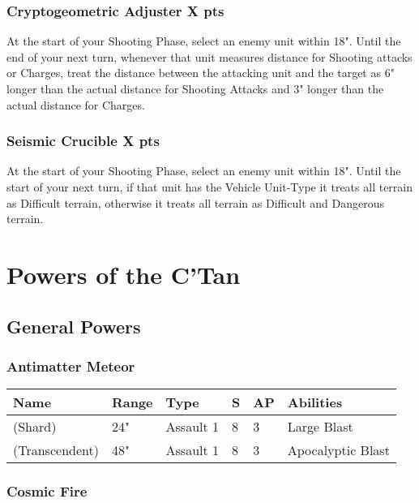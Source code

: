 \subsubsection[Cryptogeometric Adjuster ]{Cryptogeometric Adjuster  \hrulefill X pts}

At the start of your Shooting Phase, select an enemy unit within 18". Until the end of your next turn, whenever that unit measures distance for Shooting attacks or Charges, treat the distance between the attacking unit and the target as 6" longer than the actual distance for Shooting Attacks and 3" longer than the actual distance for Charges.


\subsubsection[Seismic Crucible]{Seismic Crucible \hrulefill X pts}

At the start of your Shooting Phase, select an enemy unit within 18". Until the start of your next turn, if that unit has the Vehicle Unit-Type it treats all terrain as Difficult terrain, otherwise it treats all terrain as Difficult and Dangerous terrain.


\section{Powers of the C'Tan} \label{Powers of the C'Tan}

\subsection{General Powers}

\subsubsection{Antimatter Meteor} \label{Antimatter Meteor}

\noindent
\begin{tabular}{||m{160pt} m{31pt} m{55pt} m{12pt} m{12pt} m{200pt}||}
	\hline
	Name & Range & Type & S & AP & Abilities \\
	\hline
	\quickref{Antimatter Meteor} (Shard) & 24" & Assault 1 & 8 & 3 & Large Blast \\
	\quickref{Antimatter Meteor} (Transcendent) & 48" & Assault 1 & 8 & 3 & Apocalyptic Blast \\
	\hline
\end{tabular}

\subsubsection{Cosmic Fire} \label{Cosmic Fire}

